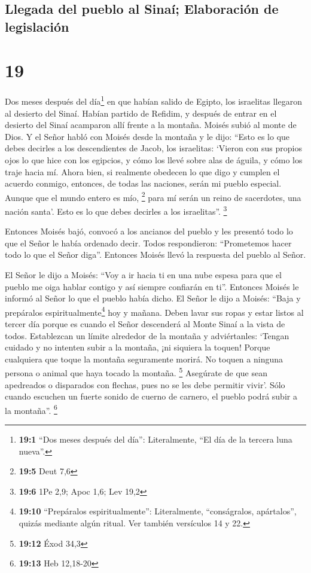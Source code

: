 \hypertarget{llegada-del-pueblo-al-sinauxed-elaboraciuxf3n-de-legislaciuxf3n}{%
\subsection{Llegada del pueblo al Sinaí; Elaboración de
legislación}\label{llegada-del-pueblo-al-sinauxed-elaboraciuxf3n-de-legislaciuxf3n}}

\hypertarget{section-18}{%
\section{19}\label{section-18}}

 Dos meses después del día\footnote{\textbf{19:1} ``Dos
  meses después del día'': Literalmente, ``El día de la tercera luna
  nueva''.} en que habían salido de Egipto, los israelitas llegaron al
desierto del Sinaí.  Habían partido de Refidim, y después
de entrar en el desierto del Sinaí acamparon allí frente a la montaña.
 Moisés subió al monte de Dios. Y el Señor habló con
Moisés desde la montaña y le dijo: ``Esto es lo que debes decirles a los
descendientes de Jacob, los israelitas:  `Vieron con sus
propios ojos lo que hice con los egipcios, y cómo los llevé sobre alas
de águila, y cómo los traje hacia mí.  Ahora bien, si
realmente obedecen lo que digo y cumplen el acuerdo conmigo, entonces,
de todas las naciones, serán mi pueblo especial. Aunque que el mundo
entero es mío, \footnote{\textbf{19:5} Deut 7,6}  para mí
serán un reino de sacerdotes, una nación santa'. Esto es lo que debes
decirles a los israelitas''. \footnote{\textbf{19:6} 1Pe 2,9; Apoc 1,6;
  Lev 19,2}

 Entonces Moisés bajó, convocó a los ancianos del pueblo y
les presentó todo lo que el Señor le había ordenado decir.
 Todos respondieron: ``Prometemos hacer todo lo que el
Señor diga''. Entonces Moisés llevó la respuesta del pueblo al Señor.

 El Señor le dijo a Moisés: ``Voy a ir hacia ti en una
nube espesa para que el pueblo me oiga hablar contigo y así siempre
confiarán en ti''. Entonces Moisés le informó al Señor lo que el pueblo
había dicho.  El Señor le dijo a Moisés: ``Baja y
prepáralos espiritualmente\footnote{\textbf{19:10} ``Prepáralos
  espiritualmente'': Literalmente, ``conságralos, apártalos'', quizás
  mediante algún ritual. Ver también versículos 14 y 22.} hoy y mañana.
Deben lavar sus ropas  y estar listos al tercer día
porque es cuando el Señor descenderá al Monte Sinaí a la vista de todos.
 Establezcan un límite alrededor de la montaña y
adviértanles: `Tengan cuidado y no intenten subir a la montaña, ¡ni
siquiera la toquen! Porque cualquiera que toque la montaña seguramente
morirá. No toquen a ninguna persona o animal que haya tocado la montaña.
\footnote{\textbf{19:12} Éxod 34,3}  Asegúrate de que
sean apedreados o disparados con flechas, pues no se les debe permitir
vivir'. Sólo cuando escuchen un fuerte sonido de cuerno de carnero, el
pueblo podrá subir a la montaña''. \footnote{\textbf{19:13} Heb 12,18-20}

